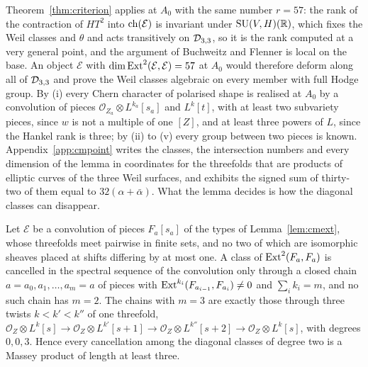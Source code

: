 Theorem~\ref{thm:criterion} applies at $A_{0}$ with the same number $r=57$: the rank of the contraction of $HT^{2}$ into $\mathrm{ch}(\mathcal{E})$ is invariant under $\mathrm{SU}(V,H)(\mathbb{R})$, which fixes the Weil classes and $\theta$ and acts transitively on $\mathcal{D}_{3,3}$, so it is the rank computed at a very general point, and the argument of Buchweitz and Flenner is local on the base. An object $\mathcal{E}$ with $\dim\mathrm{Ext}^{2}(\mathcal{E},\mathcal{E})=57$ at $A_{0}$ would therefore deform along all of $\mathcal{D}_{3,3}$ and prove the Weil classes algebraic on every member with full Hodge group. By (i) every Chern character of polarised shape is realised at $A_{0}$ by a convolution of pieces $\mathcal{O}_{Z_{a}}\otimes L^{k_{a}}[s_{a}]$ and $L^{k}[t]$, with at least two subvariety pieces, since $w$ is not a multiple of one $[Z]$, and at least three powers of $L$, since the Hankel rank is three; by (ii) to (v) every group between two pieces is known. Appendix~\ref{app:cmpoint} writes the classes, the intersection numbers and every dimension of the lemma in coordinates for the threefolds that are products of elliptic curves of the three Weil surfaces, and exhibits the signed sum of thirty-two of them equal to $32(\alpha+\bar\alpha)$. What the lemma decides is how the diagonal classes can disappear.

\begin{proposition}\label{prop:twostep}
Let $\mathcal{E}$ be a convolution of pieces $F_{a}[s_{a}]$ of the types of Lemma~\ref{lem:cmext}, whose threefolds meet pairwise in finite sets, and no two of which are isomorphic sheaves placed at shifts differing by at most one. A class of $\mathrm{Ext}^{2}(F_{a},F_{a})$ is cancelled in the spectral sequence of the convolution only through a closed chain $a=a_{0},a_{1},\dots,a_{m}=a$ of pieces with $\mathrm{Ext}^{k_{i}}(F_{a_{i-1}},F_{a_{i}})\ne0$ and $\sum_{i}k_{i}=m$, and no such chain has $m=2$. The chains with $m=3$ are exactly those through three twists $k<k'<k''$ of one threefold, $\mathcal{O}_{Z}\otimes L^{k}[s]\to\mathcal{O}_{Z}\otimes L^{k'}[s+1]\to\mathcal{O}_{Z}\otimes L^{k''}[s+2]\to\mathcal{O}_{Z}\otimes L^{k}[s]$, with degrees $0,0,3$. Hence every cancellation among the diagonal classes of degree two is a Massey product of length at least three.
\end{proposition}

